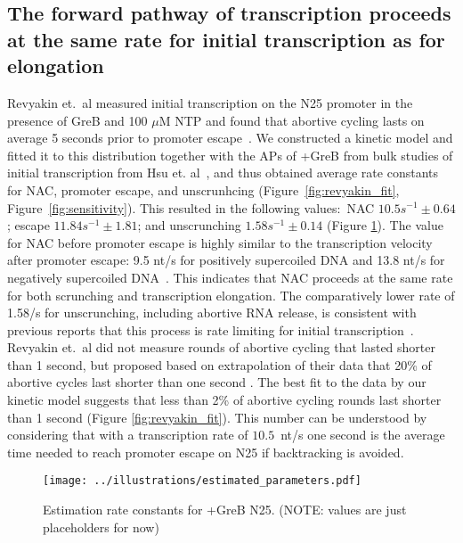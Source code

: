 %
\subsection{The forward pathway of transcription proceeds at the same rate
for initial transcription as for elongation}
Revyakin et.\ al measured initial transcription on the N25 promoter in the
presence of GreB and 100 $\mu$M NTP and found that abortive cycling lasts on
average 5 seconds prior to promoter escape~\cite{revyakin_abortive_2006}. We
constructed a kinetic model and fitted it to this distribution together with the
APs of +GreB from bulk studies of initial transcription from
Hsu et. al~\cite{hsu_initial_2006}, and thus obtained average rate constants
for NAC, promoter escape, and unscrunhcing (Figure~\ref{fig:revyakin_fit},
Figure~\ref{fig:sensitivity}). This resulted in the following values:~NAC
$10.5 s^{-1} \pm 0.64$; escape $11.84 s^{-1} \pm 1.81$; and unscrunching $1.58 s^{-1} \pm
0.14$ (Figure \ref{fig:parameter_estimation}). The value for NAC before
promoter escape is highly similar to the transcription velocity after promoter
escape: 9.5 nt/s for positively supercoiled DNA and 13.8 nt/s for negatively
supercoiled DNA~\cite{revyakin_abortive_2006}. This indicates that NAC
proceeds at the same rate for both scrunching and transcription elongation.
The comparatively lower rate of 1.58/s for unscrunching, including abortive
RNA release, is consistent with previous reports that this process is rate
limiting for initial transcription~\cite{margeat_direct_2006,
revyakin_abortive_2006}.  Revyakin et.\ al did not measure rounds of abortive
cycling that lasted shorter than 1 second, but proposed based on extrapolation
of their data that 20\% of abortive cycles last shorter than one second
\cite{revyakin_abortive_2006}. The best fit to the data by our kinetic model
suggests that less than 2\% of abortive cycling rounds last shorter than 1
second (Figure \ref{fig:revyakin_fit}). This number can be understood by
considering that with a transcription rate of $10.5$~nt/s one second is the
average time needed to reach promoter escape on N25 if backtracking is
avoided.

\begin{figure}
	\begin{center}
        \texttt{[image: ../illustrations/estimated\_parameters.pdf]}
	\end{center}
    \caption{Estimation rate constants for +GreB N25. (NOTE: values are just
    placeholders for now)}
    \label{fig:parameter_estimation}
\end{figure}

